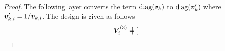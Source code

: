 \begin{proof}
The following layer converts the term $\text{diag}(\boldsymbol{v}_k)$ to $\text{diag}(\boldsymbol{v}_k^\prime)$ where $\boldsymbol{v}_{k,i}^\prime = 1/\boldsymbol{v}_{k,i}$. The design is given as follows
\begin{align*}
    \boldsymbol{V}_{i}^{(3)} &= \begin{bmatrix}

\end{bmatrix}
\end{align*}
\end{proof}
